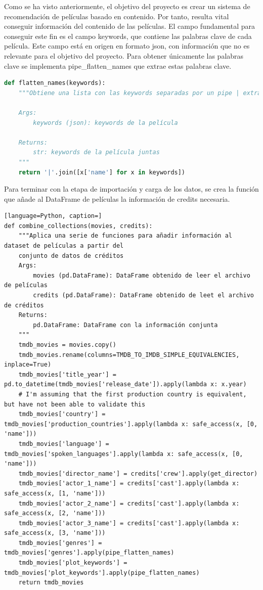 Como se ha visto anteriormente, el objetivo del proyecto es crear un sistema de recomendación de películas basado en contenido. Por tanto, resulta vital conseguir información del contenido de las películas. El campo fundamental para conseguir este fin es el campo keywords, que contiene las palabras clave de cada película. Este campo está en origen en formato json, con información que no es relevante para el objetivo del proyecto. Para obtener únicamente las palabras clave se implementa pipe\_flatten\_names que extrae estas palabras clave.
\begin{lstlisting}[language=Python, caption= Extracción de las palabras clave a partir del JSON del DataFrame.]
def flatten_names(keywords):
    """Obtiene una lista con las keywords separadas por un pipe | extrayéndolas del json.
    
    Args:
        keywords (json): keywords de la película
    
    Returns:
        str: keywords de la película juntas
    """
    return '|'.join([x['name'] for x in keywords])
\end{lstlisting}

Para terminar con la etapa de importación y carga de los datos, se crea la función que añade al DataFrame de películas la información de credits necesaria.
\begin{lstlisting}[language=Python, caption=]
def combine_collections(movies, credits):
    """Aplica una serie de funciones para añadir información al dataset de películas a partir del
    conjunto de datos de créditos
    Args:
        movies (pd.DataFrame): DataFrame obtenido de leer el archivo de películas
        credits (pd.DataFrame): DataFrame obtenido de leet el archivo de créditos
    Returns:
        pd.DataFrame: DataFrame con la información conjunta
    """
    tmdb_movies = movies.copy()
    tmdb_movies.rename(columns=TMDB_TO_IMDB_SIMPLE_EQUIVALENCIES, inplace=True)
    tmdb_movies['title_year'] = pd.to_datetime(tmdb_movies['release_date']).apply(lambda x: x.year)
    # I'm assuming that the first production country is equivalent, but have not been able to validate this
    tmdb_movies['country'] = tmdb_movies['production_countries'].apply(lambda x: safe_access(x, [0, 'name']))
    tmdb_movies['language'] = tmdb_movies['spoken_languages'].apply(lambda x: safe_access(x, [0, 'name']))
    tmdb_movies['director_name'] = credits['crew'].apply(get_director)
    tmdb_movies['actor_1_name'] = credits['cast'].apply(lambda x: safe_access(x, [1, 'name']))
    tmdb_movies['actor_2_name'] = credits['cast'].apply(lambda x: safe_access(x, [2, 'name']))
    tmdb_movies['actor_3_name'] = credits['cast'].apply(lambda x: safe_access(x, [3, 'name']))
    tmdb_movies['genres'] = tmdb_movies['genres'].apply(pipe_flatten_names)
    tmdb_movies['plot_keywords'] = tmdb_movies['plot_keywords'].apply(pipe_flatten_names)
    return tmdb_movies
\end{lstlisting}

